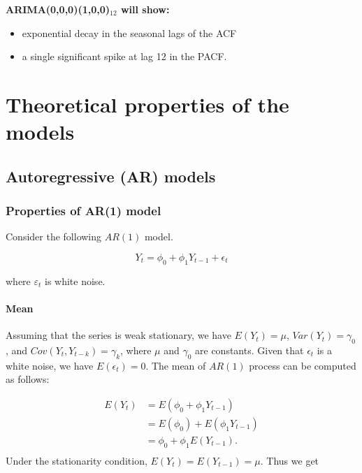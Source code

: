 \documentclass[]{book}
\providecommand{\tightlist}{%
  \setlength{\itemsep}{0pt}\setlength{\parskip}{0pt}}
\let\oldparagraph\paragraph
\renewcommand{\paragraph}[1]{\oldparagraph{#1}\mbox{}}
\begin{document}
\textbf{ARIMA(0,0,0)(1,0,0)\(_{12}\) will show:}

\begin{itemize}
\tightlist
\item
  exponential decay in the seasonal lags of the ACF
\item
  a single significant spike at lag 12 in the PACF.
\end{itemize}

\hypertarget{theoretical-properties-of-the-models}{%
\section{Theoretical properties of the models}\label{theoretical-properties-of-the-models}}

\hypertarget{autoregressive-ar-models}{%
\subsection{Autoregressive (AR) models}\label{autoregressive-ar-models}}

\hypertarget{properties-of-ar1-model}{%
\subsubsection{Properties of AR(1) model}\label{properties-of-ar1-model}}

Consider the following \(AR(1)\) model.

\begin{equation}
  \label{eq:ar}
Y_t=\phi_0+\phi_1Y_{t-1}+\epsilon_{t}
\end{equation}

where \(\varepsilon_t\) is white noise.

\hypertarget{mean}{%
\paragraph{Mean}\label{mean}}

Assuming that the series is weak stationary, we have \(E(Y_t)=\mu\), \(Var(Y_t)=\gamma_0\), and \(Cov(Y_t, Y_{t-k})=\gamma_k\), where \(\mu\) and \(\gamma_0\) are constants. Given that \({\epsilon_t}\) is a white noise, we have \(E(\epsilon_t)=0\). The mean of \(AR(1)\) process can be computed as follows:

\[
\begin{aligned}
  E(Y_t) &= E(\phi_0+\phi_1 Y_{t-1}) \\
         &= E(\phi_0) +E(\phi_1 Y_{t-1}) \\
         &= \phi_0 +\phi_1 E(Y_{t-1}). \\
\end{aligned}
\]
Under the stationarity condition, \(E(Y_t)=E(Y_{t-1})=\mu\). Thus we get
\end{document}
